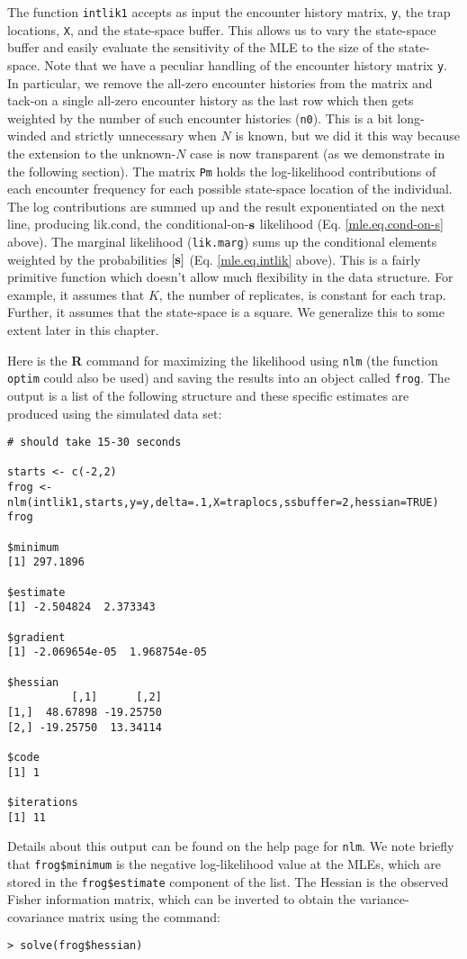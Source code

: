 The function \mbox{\tt intlik1} accepts as input the encounter history
matrix, \mbox{\tt y}, the
trap locations, \mbox{\tt X}, and the state-space buffer. This allows us to
vary the state-space buffer and easily evaluate the sensitivity of the
MLE to the size of the state-space.  Note that we have a peculiar
handling of the encounter history matrix \mbox{\tt y}. In particular, we remove
the all-zero encounter histories from the matrix and tack-on a single
all-zero encounter history as the last row which then gets weighted by
the number of such encounter histories (\mbox{\tt n0}). This is a bit
long-winded and strictly unnecessary when $N$ is known, but we did it
this way because the extension to the unknown-$N$ case is now
transparent (as we demonstrate in the following section).  The matrix
\mbox{\tt Pm} holds the log-likelihood contributions of each encounter
frequency for each possible state-space location of the individual.
The log contributions are summed up and the result exponentiated on
the next line, producing lik.cond, the conditional-on-${\bf s}$
likelihood (Eq. \ref{mle.eq.cond-on-s} above). The marginal likelihood
(\mbox{\tt lik.marg}) sums up the conditional elements weighted by the probabilities
$[{\bf s}]$ (Eq. \ref{mle.eq.intlik} above).  This is a fairly
primitive function which doesn't allow much flexibility in the data
structure. For example, it assumes that $K$, the number of replicates,
is constant for each trap. Further, it assumes that the state-space is
a square. We generalize this to some extent later in this chapter.

Here is the {\bf R} command for maximizing the likelihood using
\mbox{\tt nlm} (the function \mbox{\tt optim} could also be used) and saving the
results into an object called \mbox{\tt frog}.  The output is a list of the
following structure and these specific estimates are produced using
the simulated data set:

{\small 
\begin{verbatim}
# should take 15-30 seconds

starts <- c(-2,2)
frog <- nlm(intlik1,starts,y=y,delta=.1,X=traplocs,ssbuffer=2,hessian=TRUE)
frog

$minimum
[1] 297.1896

$estimate
[1] -2.504824  2.373343

$gradient
[1] -2.069654e-05  1.968754e-05

$hessian
          [,1]      [,2]
[1,]  48.67898 -19.25750
[2,] -19.25750  13.34114

$code
[1] 1

$iterations
[1] 11
\end{verbatim}
} 
Details about this output can be found on the help page for
\mbox{\tt nlm}. We note briefly that \mbox{\tt frog\$minimum} is the
negative log-likelihood value at the MLEs, which are stored in the
\mbox{\tt frog\$estimate} component of the list. The Hessian is the
observed Fisher information matrix, which can be inverted to obtain
the variance-covariance matrix using the command:
\begin{verbatim}
> solve(frog$hessian)
\end{verbatim}

